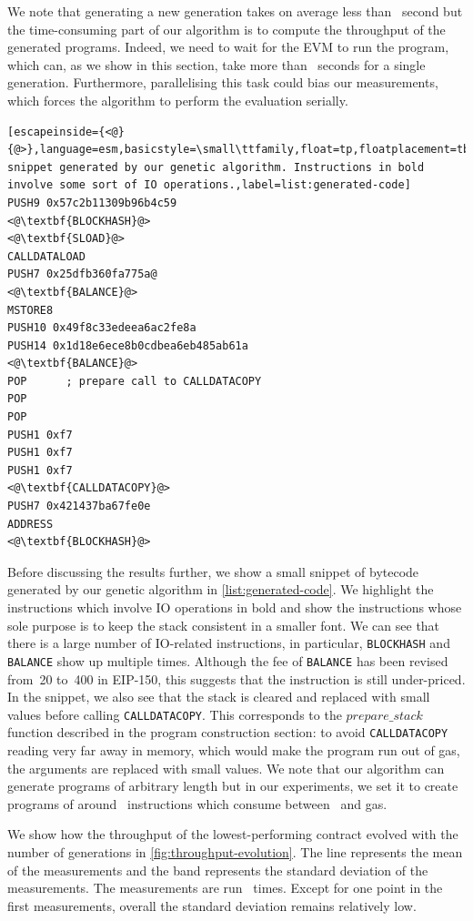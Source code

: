   We note that generating a new generation takes on average less than~ second but the time-consuming part of our algorithm is to compute the throughput of the generated programs. Indeed, we need to wait for the EVM to run the program, which can, as we show in this section, take more than~ seconds for a single generation. Furthermore, parallelising this task could bias our measurements, which forces the algorithm to perform the evaluation serially.

  \begin{lstlisting}[escapeinside={<@}{@>},language=esm,basicstyle=\small\ttfamily,float=tp,floatplacement=tbp,caption=Bytecode snippet generated by our genetic algorithm. Instructions in bold involve some sort of IO operations.,label=list:generated-code]
PUSH9 0x57c2b11309b96b4c59
<@\textbf{BLOCKHASH}@>
<@\textbf{SLOAD}@>
CALLDATALOAD
PUSH7 0x25dfb360fa775a@
<@\textbf{BALANCE}@>
MSTORE8
PUSH10 0x49f8c33edeea6ac2fe8a
PUSH14 0x1d18e6ece8b0cdbea6eb485ab61a
<@\textbf{BALANCE}@>
POP      ; prepare call to CALLDATACOPY
POP
POP
PUSH1 0xf7
PUSH1 0xf7
PUSH1 0xf7
<@\textbf{CALLDATACOPY}@>
PUSH7 0x421437ba67fe0e
ADDRESS
<@\textbf{BLOCKHASH}@>
\end{lstlisting}

  Before discussing the results further, we show a small snippet of bytecode generated by our genetic algorithm in \autoref{list:generated-code}. We highlight the instructions which involve IO operations in bold and show the instructions whose sole purpose is to keep the stack consistent in a smaller font. We can see that there is a large number of IO-related instructions, in particular, \lstinline{BLOCKHASH} and \lstinline{BALANCE} show up multiple times. Although the fee of \lstinline{BALANCE} has been revised from~20 to~400 in EIP-150, this suggests that the instruction is still under-priced. In the snippet, we also see that the stack is cleared and replaced with small values before calling \lstinline{CALLDATACOPY}. This corresponds to the $prepare\_stack$ function described in the program construction section: to avoid \lstinline{CALLDATACOPY} reading very far away in memory, which would make the program run out of gas, the arguments are replaced with small values. We note that our algorithm can generate programs of arbitrary length but in our experiments, we set it to create programs of around~ instructions which consume between~ and  gas.

  We show how the throughput of the lowest-performing contract evolved with the number of generations in \autoref{fig:throughput-evolution}. The line represents the mean of the measurements and the band represents the standard deviation of the measurements. The measurements are run~ times.
  Except for one point in the first measurements, overall the standard deviation remains relatively low.

